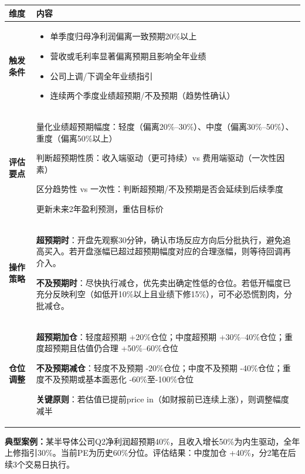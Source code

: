 \begin{exhibitbox}
\scriptsize
\setlength{\tabcolsep}{3pt}
\renewcommand{\arraystretch}{1.12}
\begin{tabularx}{\textwidth}{l X}
\toprule
\textbf{维度} & \textbf{内容} \\
\midrule
\textbf{触发条件} & 
\begin{itemize}[leftmargin=1.2em]
\item 单季度归母净利润偏离一致预期20\%以上
\item 营收或毛利率显著偏离预期且影响全年业绩
\item 公司上调/下调全年业绩指引
\item 连续两个季度业绩超预期/不及预期（趋势性确认）
\end{itemize}
\\
\midrule
\textbf{评估要点} & 
量化业绩超预期幅度：轻度（偏离20\%--30\%）、中度（偏离30\%--50\%）、重度（偏离50\%以上）

判断超预期性质：收入端驱动（更可持续）vs 费用端驱动（一次性因素）

区分趋势性 vs 一次性：判断超预期/不及预期是否会延续到后续季度

更新未来2年盈利预测，重估目标价
\\
\midrule
\textbf{操作策略} & 
\textbf{超预期时}：开盘先观察30分钟，确认市场反应方向后分批执行，避免追高买入。若开盘涨幅已超过超预期幅度对应的合理涨幅，则等待回调再介入。

\textbf{不及预期时}：尽快执行减仓，优先卖出确定性低的仓位。若低开幅度已充分反映利空（如低开10\%以上且业绩下修15\%），可不必恐慌割肉，分批减仓。
\\
\midrule
\textbf{仓位调整} & 
\textbf{超预期加仓}：轻度超预期 +20\%仓位；中度超预期 +30\%--40\%仓位；重度超预期且估值仍合理 +50\%--60\%仓位

\textbf{不及预期减仓}：轻度不及预期 -20\%仓位；中度不及预期 -40\%仓位；重度不及预期或基本面恶化 -60\%至-100\%仓位

\textbf{关键原则}：若估值已提前price in（如财报前已连续上涨），则调整幅度减半
\\
\bottomrule
\end{tabularx}
\vspace{0.2cm}

\textbf{典型案例：}某半导体公司Q2净利润超预期40\%，且收入增长50\%为内生驱动，全年上修指引30\%。当前PE为历史60\%分位。评估结果：中度加仓 +40\%，分2笔在后续3个交易日执行。
\end{exhibitbox}

